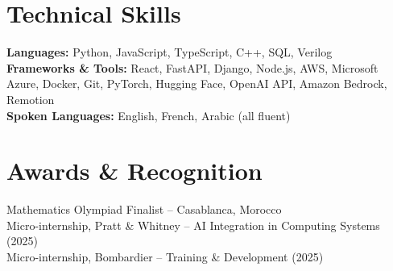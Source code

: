 \documentclass[letterpaper,10pt]{article}
\begin{document}
\section{Technical Skills}
\begin{itemize}[leftmargin=0.15in,label={}]
  \small{\item{
    \textbf{Languages:} Python, JavaScript, TypeScript, C++, SQL, Verilog \\
    \textbf{Frameworks \& Tools:} React, FastAPI, Django, Node.js, AWS, Microsoft Azure, Docker, Git, PyTorch, Hugging Face, OpenAI API, Amazon Bedrock, Remotion \\
    \textbf{Spoken Languages:} English, French, Arabic (all fluent)
  }}
\end{itemize}

\section{Awards \& Recognition}
\begin{itemize}[leftmargin=0.15in,label={}]
  \small{\item{
    Mathematics Olympiad Finalist -- Casablanca, Morocco \\
    Micro-internship, Pratt \& Whitney -- AI Integration in Computing Systems (2025) \\
    Micro-internship, Bombardier -- Training \& Development (2025)
  }}
\end{itemize}
\end{document}
